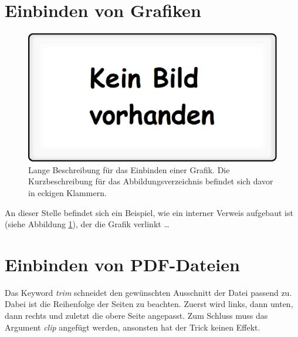 \section{Einbinden von Grafiken}
\label{sec:EinbindenVonGrafiken}

\FloatBarrier
\begin{figure}[htb]
  \centering  
  \includegraphics[scale=0.3]{img/kein_bild_vorhanden.eps}
  \caption[Beispiel für das Einbinden einer Grafik.]{Lange Beschreibung für das Einbinden einer Grafik. Die Kurzbeschreibung für das Abbildungsverzeichnis befindet sich davor in eckigen Klammern.} 
  \label{fig:kein_bild_vorhanden}
\end{figure}

An dieser Stelle befindet sich ein Beispiel, wie ein interner Verweis aufgebaut ist (siehe Abbildung \ref{fig:kein_bild_vorhanden}), der die Grafik verlinkt \dots

\section{Einbinden von PDF-Dateien}
\label{sec:PDFeinfuegen}
Das Keyword \textit{trim} schneidet den gewünschten Ausschnitt der Datei passend zu. Dabei ist die Reihenfolge der Seiten zu beachten. Zuerst wird links, dann unten, dann rechts und zuletzt die obere Seite angepasst. Zum Schluss muss das Argument \textit{clip} angefügt werden, ansonsten hat der Trick keinen Effekt.

